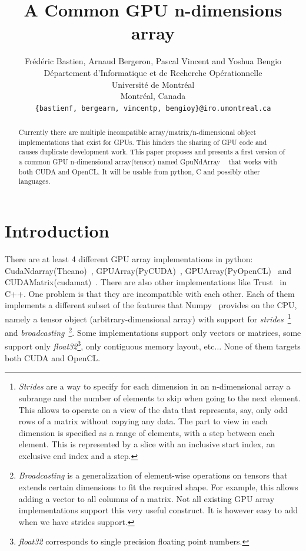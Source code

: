 \documentclass{article} %
\title{A Common GPU n-dimensions array}
\author{
Frédéric Bastien, Arnaud Bergeron, Pascal Vincent and Yoshua Bengio \\
D\'epartement d'Informatique et de Recherche Op\'erationnelle\\
Universit\'e de Montr\'eal\\
Montr\'eal, Canada \\
\texttt{\{bastienf, bergearn, vincentp, bengioy\}@iro.umontreal.ca} \\
}
\begin{document}
\maketitle

\begin{abstract}
Currently there are multiple incompatible array/matrix/n-dimensional object implementations that exist for GPUs. 
This hinders the sharing of GPU code and causes duplicate development work.
This paper proposes and presents a first version of a common GPU n-dimensional array(tensor) named GpuNdArray ~\citep{GpuNdArray} that works with both CUDA and OpenCL. 
It will be usable from python, C and possibly other languages.
\end{abstract}

\section{Introduction}
There are at least 4 different GPU array implementations in
python: CudaNdarray(Theano)~\citep{bergstra+al:2010-scipy},
GPUArray(PyCUDA)~\citep{kloeckner_pycuda_2009},
GPUArray(PyOpenCL)~\citep{kloeckner_pycuda_2009} and
CUDAMatrix(cudamat)~\citep{cudamat-TR2009}. 
There are also other implementations like Trust~\citep{Thrust} in C++. 
One problem is that they are incompatible with each other. 
Each of them implements a different subset of the features that Numpy~\citep{numpy-2007} provides on the CPU, namely a tensor object (arbitrary-dimensional array) with support for \emph{strides}~\footnote{
\emph{Strides} are a way to specify for each dimension in an n-dimensional array a subrange and the number of elements to skip when going
to the next element. 
This allows to operate on a view of the data that represents, say, only odd rows of a matrix without copying any data.
The part to view in each dimension is specified as a range of elements, with a step between each element.
This is represented by a slice with an inclusive start index, an exclusive end index and a step.
}
and \emph{broadcasting}~\footnote{
\emph{Broadcasting} is a generalization of element-wise operations on tensors that extends certain dimensions to fit the required shape.
For example, this allows adding a vector to all columns of a matrix.
Not all existing GPU array implementations support this very useful construct.
It is however easy to add when we have strides support.
}.
Some implementations support only vectors or matrices, some support only \emph{float32}\footnote{
\emph{float32} corresponds to single precision floating point numbers.
}, only contiguous memory layout, etc$\ldots$
None of them targets both CUDA and OpenCL.
\end{document}
